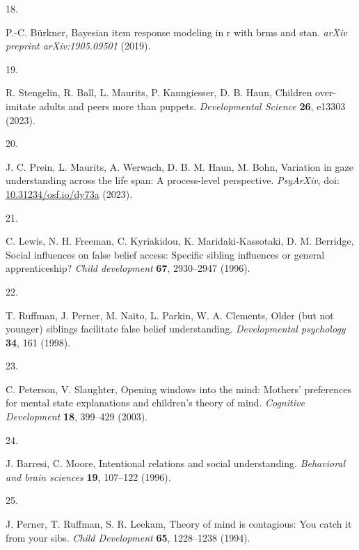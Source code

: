\documentclass[
  man,floatsintext]{apa6}
\newlength{\cslhangindent}
\newlength{\csllabelwidth}
\newlength{\cslentryspacingunit} %
\newenvironment{CSLReferences}[2] %
 {%
  \setlength{\parindent}{0pt}
  \ifodd #1
  \let\oldpar\par
  \def\par{\hangindent=\cslhangindent\oldpar}
  \fi
  \setlength{\parskip}{#2\cslentryspacingunit}
 }%
 {}
\newcommand{\CSLLeftMargin}[1]{\parbox[t]{\csllabelwidth}{#1}}
\newcommand{\CSLRightInline}[1]{\parbox[t]{\linewidth - \csllabelwidth}{#1}\break}
\begin{document}
\begin{CSLReferences}{0}{0}
\leavevmode{}%
\CSLLeftMargin{18. }%
\CSLRightInline{P.-C. Bürkner, Bayesian item response modeling in r with brms and stan. \emph{arXiv preprint arXiv:1905.09501} (2019).}

\leavevmode{}%
\CSLLeftMargin{19. }%
\CSLRightInline{R. Stengelin, R. Ball, L. Maurits, P. Kanngiesser, D. B. Haun, Children over-imitate adults and peers more than puppets. \emph{Developmental Science} \textbf{26}, e13303 (2023).}

\leavevmode{}%
\CSLLeftMargin{20. }%
\CSLRightInline{J. C. Prein, L. Maurits, A. Werwach, D. B. M. Haun, M. Bohn, Variation in gaze understanding across the life span: {A} process-level perspective. \emph{{PsyArXiv}}, doi: \href{https://doi.org/10.31234/osf.io/dy73a}{10.31234/osf.io/dy73a} (2023).}

\leavevmode{}%
\CSLLeftMargin{21. }%
\CSLRightInline{C. Lewis, N. H. Freeman, C. Kyriakidou, K. Maridaki-Kassotaki, D. M. Berridge, Social influences on false belief access: Specific sibling influences or general apprenticeship? \emph{Child development} \textbf{67}, 2930--2947 (1996).}

\leavevmode{}%
\CSLLeftMargin{22. }%
\CSLRightInline{T. Ruffman, J. Perner, M. Naito, L. Parkin, W. A. Clements, Older (but not younger) siblings facilitate false belief understanding. \emph{Developmental psychology} \textbf{34}, 161 (1998).}

\leavevmode{}%
\CSLLeftMargin{23. }%
\CSLRightInline{C. Peterson, V. Slaughter, Opening windows into the mind: Mothers' preferences for mental state explanations and children's theory of mind. \emph{Cognitive Development} \textbf{18}, 399--429 (2003).}

\leavevmode{}%
\CSLLeftMargin{24. }%
\CSLRightInline{J. Barresi, C. Moore, Intentional relations and social understanding. \emph{Behavioral and brain sciences} \textbf{19}, 107--122 (1996).}

\leavevmode{}%
\CSLLeftMargin{25. }%
\CSLRightInline{J. Perner, T. Ruffman, S. R. Leekam, Theory of mind is contagious: You catch it from your sibs. \emph{Child Development} \textbf{65}, 1228--1238 (1994).}


\end{CSLReferences}
\end{document}
